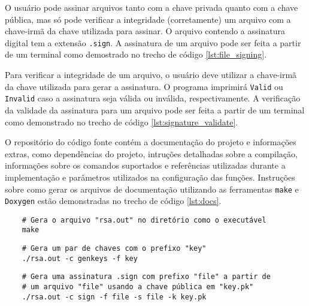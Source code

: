 \documentclass{article}
\newenvironment{code}{\captionsetup{type=listing}}{}
\begin{document}
O usuário pode assinar arquivos tanto com a chave privada quanto com a chave pública, mas só pode
verificar a integridade (corretamente) um arquivo com a chave-irmã da chave utilizada para assinar. O
arquivo contendo a assinatura digital tem a extensão {\tt .sign}. A assinatura de um arquivo pode ser
feita a partir de um terminal como demostrado no trecho de código \ref{lst:file_signing}.

Para verificar a integridade de um arquivo, o usuário deve utilizar a chave-irmã da chave utilizada para
gerar a assinatura. O programa imprimirá {\tt Valid} ou {\tt Invalid} caso a assinatura seja válida ou
inválida, respectivamente. A verificação da validade da assinatura para um arquivo pode ser feita a
partir de um terminal como demonstrado no trecho de código \ref{lst:signature_validate}.

O repositório do código fonte contém a documentação do projeto e informações extras, como dependências do
projeto, intruções detalhadas sobre a compilação, informações sobre os comandos suportados e referências
utilizadas durante a implementação e parâmetros utilizados na configuração das funções. Instruções sobre
como gerar os arquivos de documentação utilizando as ferramentas {\tt make} e {\tt Doxygen} estão
demonstradas no trecho de código \ref{lst:docs}.

\begin{code}
\begin{verbatim}
	# Gera o arquivo "rsa.out" no diretório como o executável
	make
\end{verbatim}
\label{lst:build}
\end{code}

\begin{code}
\begin{verbatim}
	# Gera um par de chaves com o prefixo "key"
	./rsa.out -c genkeys -f key
\end{verbatim}
\label{lst:key_gen}
\end{code}

\begin{code}
\begin{verbatim}
	# Gera uma assinatura .sign com prefixo "file" a partir de
	# um arquivo "file" usando a chave pública em "key.pk"
	./rsa.out -c sign -f file -s file -k key.pk
\end{verbatim}
\label{lst:file_signing}
\end{code}
\end{document}
